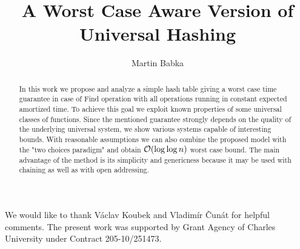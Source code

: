 \documentclass{article}
\begin{document}
\title{A Worst Case Aware Version of Universal Hashing}

\author{Martin Babka}


\begin{abstract}
In this work we propose and analyze a simple hash table giving a worst case time guarantee in case of Find operation with all operations running in constant expected amortized time.
To achieve this goal we exploit known properties of some universal classes of functions.
Since the mentioned guarantee strongly depends on the quality of the underlying universal system, we show various systems capable of interesting bounds.
With reasonable assumptions we can also combine the proposed model with the "two choices paradigm" and obtain $\mathcal{O}(\log \log n)$ worst case bound.
The main advantage of the method is its simplicity and genericness because it may be used with chaining as well as with open addressing.
\end{abstract}

\begin{article}






\acknowledgments %
{We would like to thank Václav Koubek and Vladimír Čunát for helpful comments.
The  present  work  was  supported by Grant Agency of Charles University under Contract 205-10/251473.}



\end{article}
\end{document}
